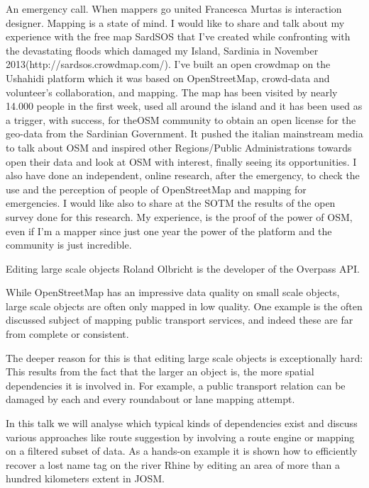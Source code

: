%
{An emergency call. When mappers go united}%
{Francesca Murtas is interaction designer. Mapping is a state of mind.}%
{I would like to share and talk about my experience with the free map SardSOS that I've created while confronting with the devastating floods which damaged my Island, Sardinia in November 2013(http://sardsos.crowdmap.com/). I've built an open crowdmap on the Ushahidi platform which it was based on OpenStreetMap, crowd-data and volunteer's collaboration, and mapping. The map has been visited by nearly 14.000 people in the first week, used all around the island and it has been used as a trigger, with success, for theOSM community to obtain an open license for the geo-data from the Sardinian Government. It pushed the italian mainstream media to talk about OSM and inspired other Regions/Public Administrations towards open their data and look at OSM with interest, finally seeing its opportunities. I also have done an independent, online research, after the emergency, to check the use and the perception of people of OpenStreetMap and mapping for emergencies. I
would like also to share at the SOTM  the results of the open survey done for this research. My experience, is the proof of the power of OSM, even if I'm a mapper since just one year the power of the platform and the community is just incredible.}

%
{Editing large scale objects}%
{Roland Olbricht is the developer of the Overpass API.}%
{While OpenStreetMap has an impressive data quality on small scale objects, large scale objects are often only mapped in low quality. One example is the often discussed subject of mapping public transport services, and indeed these are far from complete or consistent.

The deeper reason for this is that editing large scale objects is exceptionally hard: This results from the fact that the larger an object is, the more spatial dependencies it is involved in. For example, a public transport relation can be damaged by each and every roundabout or lane mapping attempt.

In this talk we will analyse which typical kinds of dependencies exist and discuss various approaches like route suggestion by involving a route engine or mapping on a filtered subset of data. As a hands-on example it is shown how to efficiently recover a lost name tag on the river Rhine by editing an area of more than a hundred kilometers extent in JOSM.}

